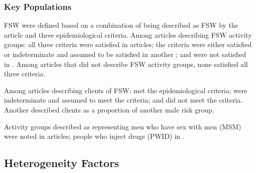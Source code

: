 \subsubsection{Key Populations}
\label{sss:res:kp}
FSW were defined based on a combination of
being described as FSW by the article and three epidemiological criteria.
Among  articles describing FSW activity groups:
all three criteria were satisfied in  articles;
the criteria were either satisfied or indeterminate and assumed to be satisfied
in another ;
and were not satisfied in .
Among articles that did not describe FSW activity groups,
none satisfied all three criteria.
\par
Among  articles describing clients of FSW:
 met the epidemiological criteria;
 were indeterminate and assumed to meet the criteria; and
 did not meet the criteria.
Another  described clients as a proportion of another male risk group.
\par
Activity groups described as representing
men who have sex with men (MSM) were noted in  articles;
people who inject drugs (PWID) in .
\subsection{Heterogeneity Factors}
\label{ss:res:factors}

